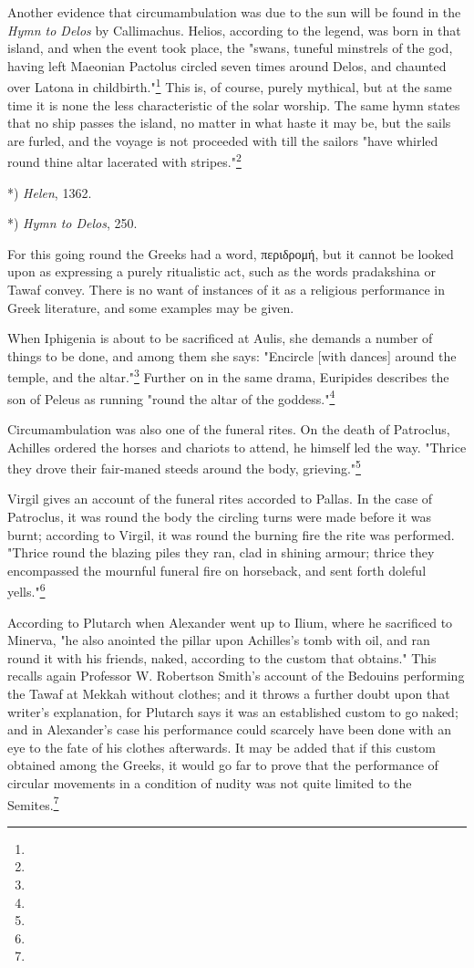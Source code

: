 \documentclass[a4paper, 11pt, oneside, polutonikogreek, english]{article}
\begin{document}
Another evidence that circumambulation was due to the sun will be found in the \emph{Hymn to Delos} by Callimachus. Helios, according to the legend, was born in that island, and when the event took place, the "swans, tuneful minstrels of the god, having left Maeonian Pactolus circled seven times around Delos, and chaunted over Latona in childbirth."\footnote{} This is, of course, purely mythical, but at the same time it is none the less characteristic of the solar worship. The same hymn states that no ship passes the island, no matter in what haste it may be, but the sails are furled, and the voyage is not proceeded with till the sailors "have whirled round thine altar lacerated with stripes."\footnote{}

*) \emph{Helen}, 1362.

*) \emph{Hymn to Delos}, 250.

For this going round the Greeks had a word, περιδρομή, but it cannot be looked upon as expressing a purely ritualistic act, such as the words pradakshina or Tawaf convey. There is no want of instances of it as a religious performance in Greek literature, and some examples may be given.

When Iphigenia is about to be sacrificed at Aulis, she demands a number of things to be done, and among them she says: "Encircle [with dances] around the temple, and the altar."\footnote{} Further on in the same drama, Euripides describes the son of Peleus as running "round the altar of the goddess."\footnote{}

Circumambulation was also one of the funeral rites. On the death of Patroclus, Achilles ordered the horses and chariots to attend, he himself led the way. "Thrice they drove their fair-maned steeds around the body, grieving."\footnote{}

Virgil gives an account of the funeral rites accorded to Pallas. In the case of Patroclus, it was round the body the circling turns were made before it was burnt; according to Virgil, it was round the burning fire the rite was performed. "Thrice round the blazing piles they ran, clad in shining armour; thrice they encompassed the mournful funeral fire on horseback, and sent forth doleful yells."\footnote{}

According to Plutarch when Alexander went up to Ilium, where he sacrificed to Minerva, "he also anointed the pillar upon Achilles's tomb with oil, and ran round it with his friends, naked, according to the custom that obtains." This recalls again Professor W. Robertson Smith's account of the Bedouins performing the Tawaf at Mekkah without clothes; and it throws a further doubt upon that writer's explanation, for Plutarch says it was an established custom to go naked; and in Alexander's case his performance could scarcely have been done with an eye to the fate of his clothes afterwards. It may be added that if this custom obtained among the Greeks, it would go far to prove that the performance of circular movements in a condition of nudity was not quite limited to the Semites.\footnote{}
\end{document}
